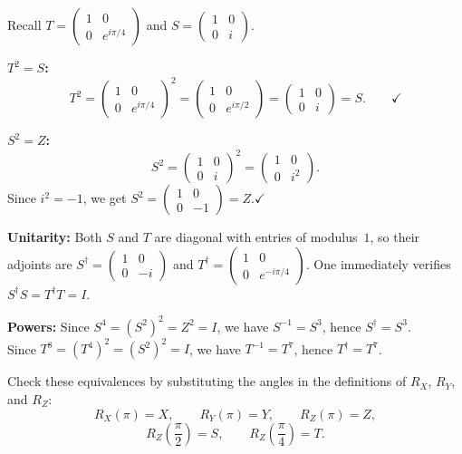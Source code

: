 \documentclass{ceri/sty/rapport}
\newcounter{exercice}[section]
\begin{document}
\begin{solution}
Recall $T=\begin{pmatrix}1&0\\0&e^{i\pi/4}\end{pmatrix}$ and $S=\begin{pmatrix}1&0\\0&i\end{pmatrix}$.

\medskip\noindent
\textbf{$T^2=S$:}
\[
  T^2 = \begin{pmatrix}1&0\\0&e^{i\pi/4}\end{pmatrix}^2
      = \begin{pmatrix}1&0\\0&e^{i\pi/2}\end{pmatrix}
      = \begin{pmatrix}1&0\\0&i\end{pmatrix} = S.\qquad\checkmark
\]

\medskip\noindent
\textbf{$S^2=Z$:}
\[
  S^2 = \begin{pmatrix}1&0\\0&i\end{pmatrix}^2
      = \begin{pmatrix}1&0\\0&i^2\end{pmatrix}.
\]
Since $i^2=-1$, we get
$S^2=\begin{pmatrix}1&0\\0&-1\end{pmatrix}=Z$.\quad$\checkmark$

\medskip\noindent
\textbf{Unitarity:}
Both $S$ and $T$ are diagonal with entries of modulus~$1$, so their adjoints are
$S^\dagger=\begin{pmatrix}1&0\\0&-i\end{pmatrix}$ and $T^\dagger=\begin{pmatrix}1&0\\0&e^{-i\pi/4}\end{pmatrix}$.
One immediately verifies $S^\dagger S = T^\dagger T = I$.

\medskip\noindent
\textbf{Powers:}
Since $S^4=(S^2)^2=Z^2=I$, we have $S^{-1}=S^3$, hence $S^\dagger = S^3$.\\
Since $T^8=(T^4)^2=(S^2)^2=I$, we have $T^{-1}=T^7$, hence $T^\dagger = T^7$.
\end{solution}

\begin{exercice}[p.~21]
Check these equivalences by substituting the angles in the definitions of
$R_X$, $R_Y$, and $R_Z$:
\[
  R_X(\pi) = X, \qquad R_Y(\pi) = Y, \qquad R_Z(\pi) = Z,
\]
\[
  R_Z\!\left(\frac{\pi}{2}\right) = S, \qquad R_Z\!\left(\frac{\pi}{4}\right) = T.
\]
\end{exercice}
\end{document}
